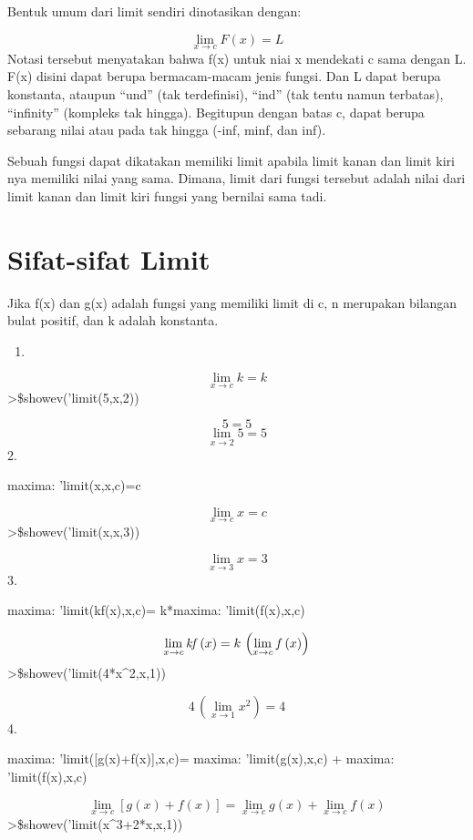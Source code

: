 \documentclass[
]{book}
\providecommand{\tightlist}{%
  \setlength{\itemsep}{0pt}\setlength{\parskip}{0pt}}
\begin{document}
Bentuk umum dari limit sendiri dinotasikan dengan:

\[\lim_{x\rightarrow c}{F\left(x\right)}=L\]Notasi tersebut menyatakan bahwa f(x) untuk niai x mendekati c sama dengan L. F(x) disini dapat berupa bermacam-macam jenis fungsi. Dan L dapat berupa konstanta, ataupun ``und'' (tak terdefinisi), ``ind'' (tak tentu namun terbatas), ``infinity'' (kompleks tak hingga). Begitupun dengan batas c, dapat berupa sebarang nilai atau pada tak hingga (-inf, minf, dan inf).

Sebuah fungsi dapat dikatakan memiliki limit apabila limit kanan dan limit kiri nya memiliki nilai yang sama. Dimana, limit dari fungsi tersebut adalah nilai dari limit kanan dan limit kiri fungsi yang bernilai sama tadi.

\section{Sifat-sifat Limit}\label{sifat-sifat-limit}

Jika f(x) dan g(x) adalah fungsi yang memiliki limit di c, n merupakan bilangan bulat positif, dan k adalah konstanta.

\begin{enumerate}
\def\labelenumi{\arabic{enumi}.}
\tightlist
\item
\end{enumerate}

\[\lim_{x \to c}k=k\]\textgreater\$showev('limit(5,x,2))

\[5=5\]\[\lim_{x \to 2}5=5\]2.

maxima: 'limit(x,x,c)=c

\[\lim_{x\rightarrow c}{x}=c\]\textgreater\$showev('limit(x,x,3))

\[\lim_{x\rightarrow 3}{x}=3\]3.

maxima: 'limit(kf(x),x,c)= k*maxima: 'limit(f(x),x,c)

\[\lim_{x\rightarrow c}{{\it kf}\left(x\right)}=k\,\left(\lim_{x  \rightarrow c}{f\left(x\right)}\right)\]\textgreater\$showev('limit(4*x\^{}2,x,1))

\[4\,\left(\lim_{x\rightarrow 1}{x^2}\right)=4\]4.

maxima: 'limit({[}g(x)+f(x){]},x,c)= maxima: 'limit(g(x),x,c) + maxima: 'limit(f(x),x,c)

\[\lim_{x\rightarrow c}{\left[ g\left(x\right)+f\left(x\right)   \right] }=\lim_{x\rightarrow c}{g\left(x\right)}+\lim_{x  \rightarrow c}{f\left(x\right)}\]\textgreater\$showev('limit(x\^{}3+2*x,x,1))
\end{document}
